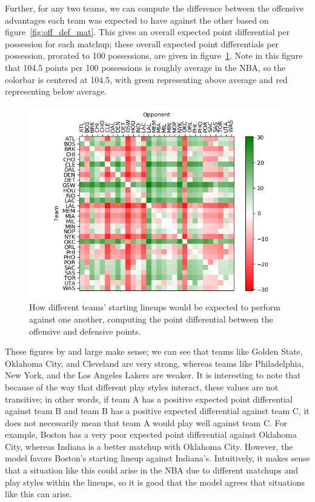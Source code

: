 Further, for any two teams, we can compute the difference between the offensive
advantages each team was expected to have against the other based on
figure~\ref{fig:off_def_mat}. This gives an overall expected point differential per
possession for each matchup; these overall expected point differentials per
possession, prorated to 100 possessions, are given in figure~\ref{fig:pd_mat}. Note
in this figure that 104.5 points per 100 possessions is roughly average in the NBA,
so the colorbar is centered at 104.5, with green representing above average and red
representing below average.

\begin{figure}
    \centering
    \includegraphics[width=\textwidth]{figures/point_diff_matrix}
    \caption{How different teams' starting lineups would be expected to perform
    against one another, computing the point differential between the offensive and
    defensive points.}
    \label{fig:pd_mat}
\end{figure}

These figures by and large make sense; we can see that teams like Golden State,
Oklahoma City, and Cleveland are very strong, whereas teams like Philadelphia, New
York, and the Los Angeles Lakers are weaker. It is interesting to note that because
of the way that different play styles interact, these values are not transitive; in
other words, if team A has a positive expected point differential against team B and
team B has a positive expected differential against team C, it does not necessarily
mean that team A would play well against team C. For example, Boston has a very poor
expected point differential against Oklahoma City, whereas Indiana is a better
matchup with Oklahoma City. However, the model favors Boston's starting lineup
against Indiana's. Intuitively, it makes sense that a situation like this could
arise in the NBA due to different matchups and play styles within the lineups, so it
is good that the model agrees that situations like this can arise.
